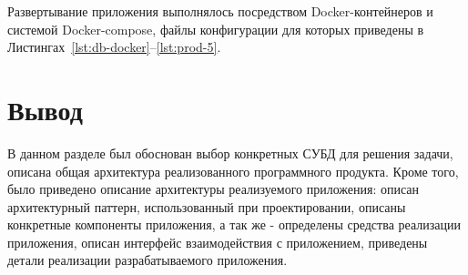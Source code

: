 Развертывание приложения выполнялось посредством Docker-контейнеров и системой Docker-compose, файлы конфигурации для которых приведены в Листингах~\ref{lst:db-docker}--\ref{lst:prod-5}.

\section*{Вывод}

В данном разделе был обоснован выбор конкретных СУБД для решения задачи, описана общая архитектура реализованного программного продукта. Кроме того, было приведено описание архитектуры реализуемого приложения: описан архитектурный паттерн, использованный при проектировании, описаны конкретные компоненты приложения, а так же - определены средства реализации приложения, описан интерфейс взаимодействия с приложением, приведены детали реализации разрабатываемого приложения.